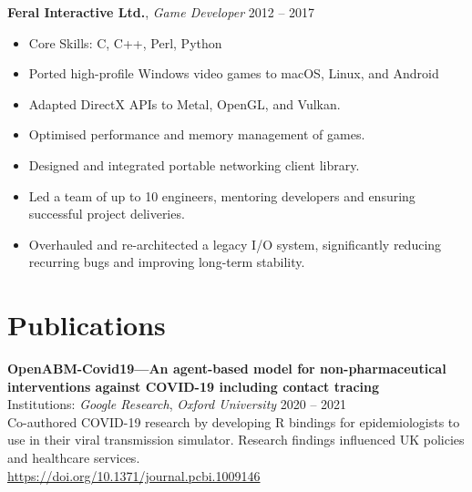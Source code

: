 \documentclass[a4paper,10pt]{article}
\newcommand{\coreskills}[1]{\item Core Skills: #1}
\newcommand{\xp}[3]{
  \vspace{1.0em}
  \textbf{#1}, \textit{#2} \hfill #3
  \vspace{0.3em}
}
\begin{document}
{\begin{minipage}[t]{0.72\textwidth}
    \xp{Feral Interactive Ltd.}{Game Developer}{2012 -- 2017}
    \begin{itemize}[leftmargin=1.5em, nosep]
        \coreskills{C, C++, Perl, Python}
        \item Ported high-profile Windows video games to macOS, Linux, and Android
        \item Adapted DirectX APIs to Metal, OpenGL, and Vulkan.
        \item Optimised performance and memory management of games.
        \item Designed and integrated portable networking client library.
        \item Led a team of up to 10 engineers, mentoring developers and ensuring successful project deliveries.
        \item Overhauled and re-architected a legacy I/O system, significantly reducing recurring bugs and improving long-term stability.
    \end{itemize}

    \section*{\color{navy} Publications}
    \textbf{OpenABM-Covid19—An agent-based model for non-pharmaceutical interventions against COVID-19 including contact tracing}\\
    Institutions: \textit{Google Research}, \textit{Oxford University} \hfill 2020 -- 2021\\[1.0em]
    Co-authored COVID-19 research by developing R bindings for epidemiologists to use in their viral transmission simulator. Research findings influenced UK policies and healthcare services.\\
    \href{https://doi.org/10.1371/journal.pcbi.1009146}{https://doi.org/10.1371/journal.pcbi.1009146}
\end{minipage}%
\vfill %
}%
\end{document}
